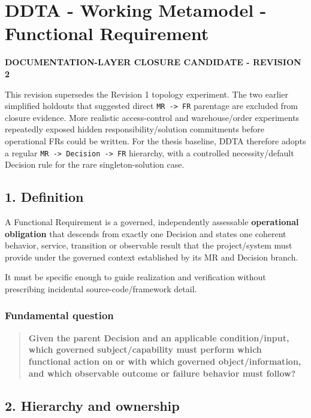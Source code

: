 \documentclass[
  10pt,
]{article}
\author{}
\date{}
\begin{document}
\section{DDTA - Working Metamodel - Functional
Requirement}\label{ddta---working-metamodel---functional-requirement}

\textbf{DOCUMENTATION-LAYER CLOSURE CANDIDATE - REVISION 2}

This revision supersedes the Revision 1 topology experiment. The two
earlier simplified holdouts that suggested direct
\texttt{MR\ -\textgreater{}\ FR} parentage are excluded from closure
evidence. More realistic access-control and warehouse/order experiments
repeatedly exposed hidden responsibility/solution commitments before
operational FRs could be written. For the thesis baseline, DDTA
therefore adopts a regular
\texttt{MR\ -\textgreater{}\ Decision\ -\textgreater{}\ FR} hierarchy,
with a controlled necessity/default Decision rule for the rare
singleton-solution case.

\subsection{1. Definition}\label{1-definition}

A Functional Requirement is a governed, independently assessable
\textbf{operational obligation} that descends from exactly one Decision
and states one coherent behavior, service, transition or observable
result that the project/system must provide under the governed context
established by its MR and Decision branch.

It must be specific enough to guide realization and verification without
prescribing incidental source-code/framework detail.

\subsubsection{Fundamental question}\label{fundamental-question}

\begin{quote}
\textbf{Given the parent Decision and an applicable condition/input,
which governed subject/capability must perform which functional action
on or with which governed object/information, and which observable
outcome or failure behavior must follow?}
\end{quote}

\subsection{2. Hierarchy and ownership}\label{2-hierarchy-and-ownership}
\end{document}

